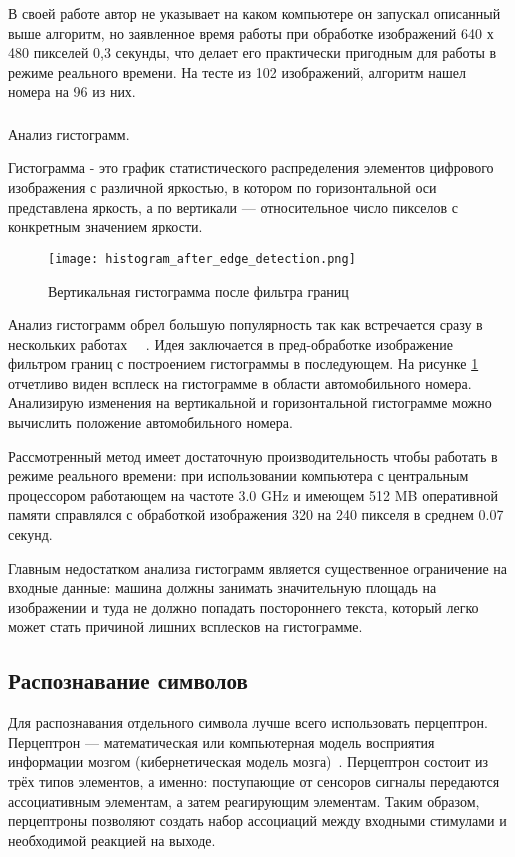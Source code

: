 В своей работе автор не указывает на каком компьютере он запускал описанный выше алгоритм, но заявленное время работы при обработке изображений 640 х 480 пикселей 0,3 секунды, что делает его практически пригодным для работы в режиме реального времени. На тесте из 102 изображений, алгоритм нашел номера на 96 из них.

\subsubsection{}
\label{sub:domain:search:histogram_analisys}
Анализ гистограмм.

Гистограмма - это график статистического распределения элементов цифрового изображения с различной яркостью, в котором по горизонтальной оси представлена яркость, а по вертикали — относительное число пикселов с конкретным значением яркости.~\cite{color_histogram}

\begin{figure}[ht]
\centering
    \texttt{[image: histogram\_after\_edge\_detection.png]}  
    \caption{Вертикальная гистограмма после фильтра границ}
    \label{fig:domain:search:edges_analisys:vertical_histogram_after_edge_detection}
\end{figure}

Анализ гистограмм обрел большую популярность так как встречается сразу в нескольких работах ~\cite{recognition_using_histogram_1}~\cite{recognition_using_histogram_2}. 
Идея заключается в пред-обработке изображение фильтром границ с построением гистограммы в последующем. На рисунке \ref{fig:domain:search:edges_analisys:vertical_histogram_after_edge_detection} отчетливо виден всплеск на гистограмме в области автомобильного номера. Анализирую изменения на вертикальной и горизонтальной гистограмме можно вычислить положение автомобильного номера. 

Рассмотренный метод имеет достаточную производительность чтобы работать в режиме реального времени: при использовании компьютера с центральным процессором работающем на частоте 3.0 GHz и имеющем 512 MB оперативной памяти справлялся с обработкой изображения 320 на 240 пикселя в среднем 0.07 секунд.

Главным недостатком анализа гистограмм является существенное ограничение на входные данные: машина должны занимать значительную площадь на изображении и туда не должно попадать постороннего текста, который легко может стать причиной лишних всплесков на гистограмме.


\subsection{Распознавание символов}
\label{sub:domain:imagerecognition}
Для распознавания отдельного символа лучше всего использовать перцептрон.
Перцептрон — математическая или компьютерная модель восприятия информации мозгом (кибернетическая модель мозга)~\cite{perceptron}.
Перцептрон состоит из трёх типов элементов, а именно: поступающие от сенсоров сигналы передаются ассоциативным элементам, а затем реагирующим элементам. Таким образом, перцептроны позволяют создать набор ассоциаций между входными стимулами и необходимой реакцией на выходе.

